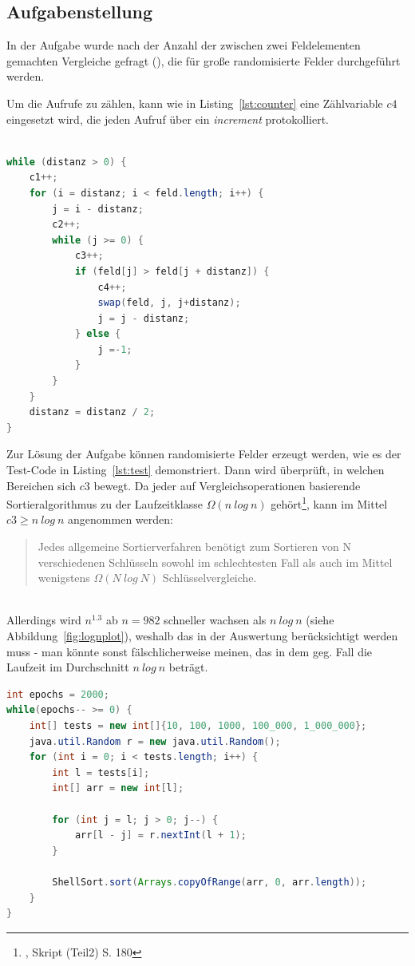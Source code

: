 \subsection*{Aufgabenstellung}
In der Aufgabe wurde nach der Anzahl der zwischen zwei Feldelementen gemachten Vergleiche gefragt (), die für große randomisierte Felder durchgeführt werden.

Um die Aufrufe zu zählen, kann wie in Listing~\ref{lst:counter} eine Zählvariable $c4$ eingesetzt wird, die jeden Aufruf über ein \textit{increment} protokolliert.

\begin{lstlisting}[language=java,caption={Zur Protokollierung der Aufrufe können in dem Code Zählvariablen eingesetzt werden ($c1, .. ,c4$).},label=lst:counter]

while (distanz > 0) {
    c1++;
    for (i = distanz; i < feld.length; i++) {
        j = i - distanz;
        c2++;
        while (j >= 0) {
            c3++;
            if (feld[j] > feld[j + distanz]) {
                c4++;
                swap(feld, j, j+distanz);
                j = j - distanz;
            } else {
                j =-1;
            }
        }
    }
    distanz = distanz / 2;
}

\end{lstlisting}

Zur Lösung der Aufgabe können randomisierte Felder erzeugt werden, wie es der Test-Code in Listing~\ref{lst:test} demonstriert. Dann wird überprüft, in welchen Bereichen sich $c3$ bewegt.
Da jeder auf Vergleichsoperationen basierende Sortieralgorithmus zu der Laufzeitklasse $\Omega(n\ log\ n)$ gehört\footnote{\cite[154]{OW17b}, Skript (Teil2) S. 180}, kann im Mittel $c3 \geq n\ log\ n$ angenommen werden:

\blockquote[{\cite[154, Satz 2.4]{OW17b}}]{
Jedes allgemeine Sortierverfahren benötigt zum Sortieren von N verschiedenen Schlüsseln sowohl im schlechtesten Fall als auch im Mittel wenigstens $\Omega(N\ log\ N)$
Schlüsselvergleiche.
}\\

Allerdings wird $n^{1.3}$ ab $n=982$ schneller wachsen als $n\ log\ n$ (siehe Abbildung~\ref{fig:lognplot}), weshalb das in der Auswertung berücksichtigt werden muss - man könnte sonst fälschlicherweise meinen, das in dem geg. Fall die Laufzeit im Durchschnitt $n\ log\ n$ beträgt.
\newpage
\begin{lstlisting}[language=java,caption={Code zum Erzeugen randomisierter Felder zum Testen von Shellsort.},label=lst:test]
int epochs = 2000;
while(epochs-- >= 0) {
    int[] tests = new int[]{10, 100, 1000, 100_000, 1_000_000};
    java.util.Random r = new java.util.Random();
    for (int i = 0; i < tests.length; i++) {
        int l = tests[i];
        int[] arr = new int[l];

        for (int j = l; j > 0; j--) {
            arr[l - j] = r.nextInt(l + 1);
        }

        ShellSort.sort(Arrays.copyOfRange(arr, 0, arr.length));
    }
}
\end{lstlisting}

